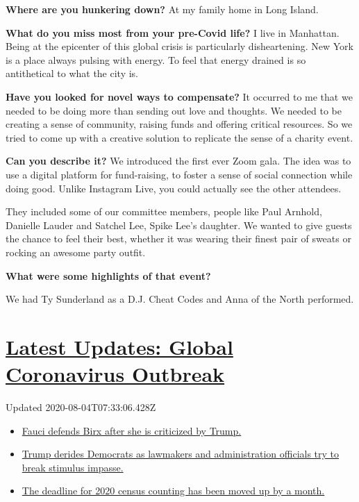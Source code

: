 \textbf{Where are you hunkering down?} At my family home in Long Island.

\textbf{What do you miss most from your pre-Covid life?} I live in
Manhattan. Being at the epicenter of this global crisis is particularly
disheartening. New York is a place always pulsing with energy. To feel
that energy drained is so antithetical to what the city is.

\textbf{Have you looked for novel ways to compensate?} It occurred to me
that we needed to be doing more than sending out love and thoughts. We
needed to be creating a sense of community, raising funds and offering
critical resources. So we tried to come up with a creative solution to
replicate the sense of a charity event.

\textbf{Can you describe it?} We introduced the first ever Zoom gala.
The idea was to use a digital platform for fund-raising, to foster a
sense of social connection while doing good. Unlike Instagram Live, you
could actually see the other attendees.

They included some of our committee members, people like Paul Arnhold,
Danielle Lauder and Satchel Lee, Spike Lee's daughter. We wanted to give
guests the chance to feel their best, whether it was wearing their
finest pair of sweats or rocking an awesome party outfit.

\textbf{What were some highlights of that event?}

We had Ty Sunderland as a D.J. Cheat Codes and Anna of the North
performed.

\hypertarget{latest-updates-global-coronavirus-outbreak}{%
\section{\texorpdfstring{\href{https://www.nytimes.com/2020/08/03/world/coronavirus-covid-19.html?action=click\&pgtype=Article\&state=default\&region=MAIN_CONTENT_1\&context=storylines_live_updates}{Latest
Updates: Global Coronavirus
Outbreak}}{Latest Updates: Global Coronavirus Outbreak}}\label{latest-updates-global-coronavirus-outbreak}}

Updated 2020-08-04T07:33:06.428Z

\begin{itemize}
\tightlist
\item
  \href{https://www.nytimes.com/2020/08/03/world/coronavirus-covid-19.html?action=click\&pgtype=Article\&state=default\&region=MAIN_CONTENT_1\&context=storylines_live_updates\#link-4547638f}{Fauci
  defends Birx after she is criticized by Trump.}
\item
  \href{https://www.nytimes.com/2020/08/03/world/coronavirus-covid-19.html?action=click\&pgtype=Article\&state=default\&region=MAIN_CONTENT_1\&context=storylines_live_updates\#link-15e7f995}{Trump
  derides Democrats as lawmakers and administration officials try to
  break stimulus impasse.}
\item
  \href{https://www.nytimes.com/2020/08/03/world/coronavirus-covid-19.html?action=click\&pgtype=Article\&state=default\&region=MAIN_CONTENT_1\&context=storylines_live_updates\#link-e5a2cda}{The
  deadline for 2020 census counting has been moved up by a month.}
\end{itemize}

